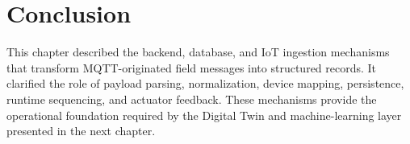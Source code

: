 \section{Conclusion}

This chapter described the backend, database, and IoT ingestion mechanisms that transform MQTT-originated field messages into structured records. It clarified the role of payload parsing, normalization, device mapping, persistence, runtime sequencing, and actuator feedback. These mechanisms provide the operational foundation required by the Digital Twin and machine-learning layer presented in the next chapter.
